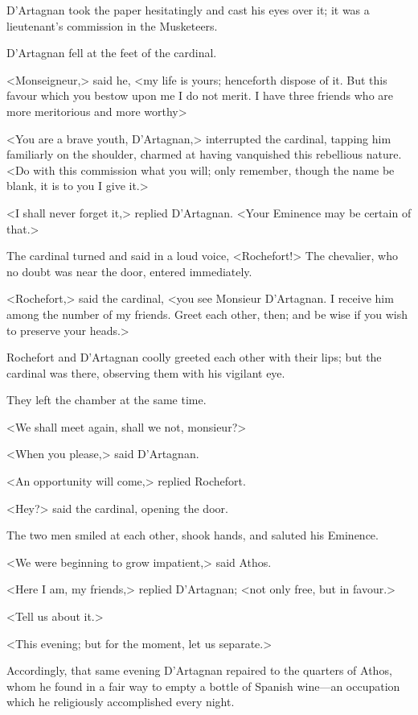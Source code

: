 D'Artagnan took the paper hesitatingly and cast his eyes over it; it was a lieutenant's commission in the Musketeers. 

D'Artagnan fell at the feet of the cardinal. 

<Monseigneur,> said he, <my life is yours; henceforth dispose of it. But this favour which you bestow upon me I do not merit. I have three friends who are more meritorious and more worthy\longdash> 

<You are a brave youth, D'Artagnan,> interrupted the cardinal, tapping him familiarly on the shoulder, charmed at having vanquished this rebellious nature. <Do with this commission what you will; only remember, though the name be blank, it is to you I give it.> 

<I shall never forget it,> replied D'Artagnan. <Your Eminence may be certain of that.> 

The cardinal turned and said in a loud voice, <Rochefort!> The chevalier, who no doubt was near the door, entered immediately. 

<Rochefort,> said the cardinal, <you see Monsieur D'Artagnan. I receive him among the number of my friends. Greet each other, then; and be wise if you wish to preserve your heads.> 

Rochefort and D'Artagnan coolly greeted each other with their lips; but the cardinal was there, observing them with his vigilant eye. 

They left the chamber at the same time. 

<We shall meet again, shall we not, monsieur?> 

<When you please,> said D'Artagnan. 

<An opportunity will come,> replied Rochefort. 

<Hey?> said the cardinal, opening the door. 

The two men smiled at each other, shook hands, and saluted his Eminence. 

<We were beginning to grow impatient,> said Athos. 

<Here I am, my friends,> replied D'Artagnan; <not only free, but in favour.> 

<Tell us about it.> 

<This evening; but for the moment, let us separate.> 

Accordingly, that same evening D'Artagnan repaired to the quarters of Athos, whom he found in a fair way to empty a bottle of Spanish wine—an occupation which he religiously accomplished every night. 

